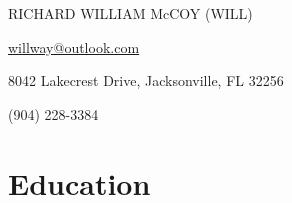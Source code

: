 \documentclass{article}
\newcommand\midtextbox[1]{%
  \parbox{.6\textwidth}{#1}%
}
\newcommand\outtextbox[1]{%
  \parbox{.2\textwidth}{#1}%
}
\newenvironment{TitleCenter}[1][\topsep]
  {\setlength{\topsep}{#1}\par\kern\topsep\centering}%
  {\par\kern\topsep}%
\begin{document}
\thispagestyle{empty}

\begin{TitleCenter}[0em]
\bfseries\huge

RICHARD WILLIAM McCOY (WILL)
\end{TitleCenter}
\noindent\outtextbox{\href{willway@outlook.com}{willway@outlook.com}\hfill}\midtextbox{\hfil8042 Lakecrest Drive, Jacksonville, FL 32256\hfil}\outtextbox{\hfill (904) 228-3384}


\vspace{.25em}
\section{Education}
\end{document}
